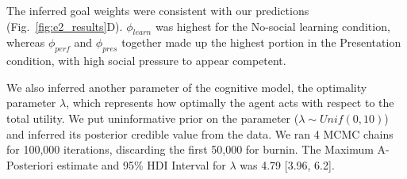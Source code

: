 \documentclass[10pt, letterpaper]{article}
\begin{document}
The inferred goal weights were consistent with our predictions
(Fig.~\ref{fig:e2_results}D). \(\phi_{learn}\) was highest for the
No-social learning condition, whereas \(\phi_{perf}\) and
\(\phi_{pres}\) together made up the highest portion in the Presentation
condition, with high social pressure to appear competent.

We also inferred another parameter of the cognitive model, the
optimality parameter \(\lambda\), which represents how optimally the
agent acts with respect to the total utility. We put uninformative prior
on the parameter (\(\lambda \sim Unif(0,10)\)) and inferred its
posterior credible value from the data. We ran 4 MCMC chains for 100,000
iterations, discarding the first 50,000 for burnin. The Maximum A-
Posteriori estimate and 95\% HDI Interval for \(\lambda\) was 4.79
{[}3.96, 6.2{]}.
\end{document}
